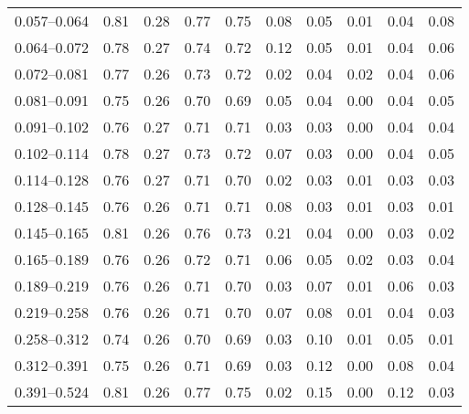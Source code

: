 \begin{table}
\begin{center}
{\begin{tabular}{@{}l l l l l l l l l l@{}}
                0.057--0.064     &  0.81   &  0.28   &  0.77         &  0.75      &  0.08    &  0.05  &  0.01       &  0.04  &  0.08  \\
                0.064--0.072     &  0.78   &  0.27   &  0.74         &  0.72      &  0.12    &  0.05  &  0.01       &  0.04  &  0.06  \\
                0.072--0.081     &  0.77   &  0.26   &  0.73         &  0.72      &  0.02    &  0.04  &  0.02       &  0.04  &  0.06  \\
                0.081--0.091     &  0.75   &  0.26   &  0.70         &  0.69      &  0.05    &  0.04  &  0.00       &  0.04  &  0.05  \\
                0.091--0.102     &  0.76   &  0.27   &  0.71         &  0.71      &  0.03    &  0.03  &  0.00       &  0.04  &  0.04  \\
                0.102--0.114     &  0.78   &  0.27   &  0.73         &  0.72      &  0.07    &  0.03  &  0.00       &  0.04  &  0.05  \\
                0.114--0.128     &  0.76   &  0.27   &  0.71         &  0.70      &  0.02    &  0.03  &  0.01       &  0.03  &  0.03  \\
                0.128--0.145     &  0.76   &  0.26   &  0.71         &  0.71      &  0.08    &  0.03  &  0.01       &  0.03  &  0.01  \\
                0.145--0.165     &  0.81   &  0.26   &  0.76         &  0.73      &  0.21    &  0.04  &  0.00       &  0.03  &  0.02  \\
                0.165--0.189     &  0.76   &  0.26   &  0.72         &  0.71      &  0.06    &  0.05  &  0.02       &  0.03  &  0.04  \\
                0.189--0.219     &  0.76   &  0.26   &  0.71         &  0.70      &  0.03    &  0.07  &  0.01       &  0.06  &  0.03  \\
                0.219--0.258     &  0.76   &  0.26   &  0.71         &  0.70      &  0.07    &  0.08  &  0.01       &  0.04  &  0.03  \\
                0.258--0.312     &  0.74   &  0.26   &  0.70         &  0.69      &  0.03    &  0.10  &  0.01       &  0.05  &  0.01  \\
                0.312--0.391     &  0.75   &  0.26   &  0.71         &  0.69      &  0.03    &  0.12  &  0.00       &  0.08  &  0.04  \\
                0.391--0.524     &  0.81   &  0.26   &  0.77         &  0.75      &  0.02    &  0.15  &  0.00       &  0.12  &  0.03  \\

\end{tabular}}
\end{center}
\end{table}
